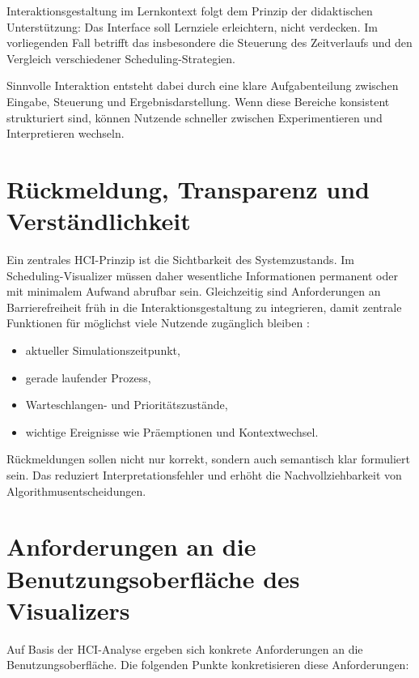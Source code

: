 Interaktionsgestaltung im Lernkontext folgt dem Prinzip der didaktischen Unterstützung: Das Interface soll Lernziele erleichtern, nicht verdecken. Im vorliegenden Fall betrifft das insbesondere die Steuerung des Zeitverlaufs und den Vergleich verschiedener Scheduling-Strategien.

Sinnvolle Interaktion entsteht dabei durch eine klare Aufgabenteilung zwischen Eingabe, Steuerung und Ergebnisdarstellung. Wenn diese Bereiche konsistent strukturiert sind, können Nutzende schneller zwischen Experimentieren und Interpretieren wechseln.

\section{Rückmeldung, Transparenz und Verständlichkeit}

Ein zentrales HCI-Prinzip ist die Sichtbarkeit des Systemzustands. Im Scheduling-Visualizer müssen daher wesentliche Informationen permanent oder mit minimalem Aufwand abrufbar sein. Gleichzeitig sind Anforderungen an Barrierefreiheit früh in die Interaktionsgestaltung zu integrieren, damit zentrale Funktionen für möglichst viele Nutzende zugänglich bleiben \cite{wcag2018}:

\begin{itemize}
    \item aktueller Simulationszeitpunkt,
    \item gerade laufender Prozess,
    \item Warteschlangen- und Prioritätszustände,
    \item wichtige Ereignisse wie Präemptionen und Kontextwechsel.
\end{itemize}

Rückmeldungen sollen nicht nur korrekt, sondern auch semantisch klar formuliert sein. Das reduziert Interpretationsfehler und erhöht die Nachvollziehbarkeit von Algorithmusentscheidungen.

\section{Anforderungen an die Benutzungsoberfläche des Visualizers}

Auf Basis der HCI-Analyse ergeben sich konkrete Anforderungen an die Benutzungsoberfläche.
Die folgenden Punkte konkretisieren diese Anforderungen:

